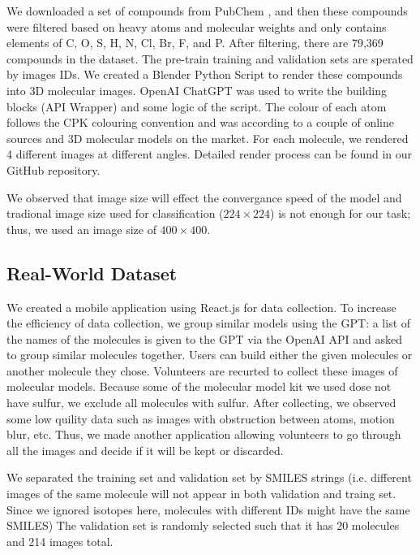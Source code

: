 \documentclass{article}
\begin{document}
We downloaded a set of compounds from PubChem \autocite{kim_pubchem_2023}, and then these compounds were filtered based on heavy atoms and molecular weights and only contains elements of C, O, S, H, N, Cl, Br, F, and P.
After filtering, there are 79,369 compounds in the dataset. The pre-train training and validation sets are sperated by images IDs. We created a Blender Python Script to render these compounds into 3D molecular images. OpenAI ChatGPT was used to write the building blocks (API Wrapper) and some logic of the script. The colour of each atom follows the CPK colouring convention and was according to a couple of online sources and 3D molecular models on the market. For each molecule, we rendered 4 different images at different angles. Detailed render process can be found in our GitHub repository. 

We observed that image size will effect the convergance speed of the model and tradional image size used for classification ($224\times224$) is not enough for our task; thus, we used an image size of $400\times400$. 
\subsection{Real-World Dataset}
We created a mobile application using React.js for data collection. To increase the efficiency of data collection, we group similar models using the GPT: a list of the names of the molecules is given to the GPT via the OpenAI API and asked to group similar molecules together. Users can build either the given molecules or another molecule they chose. Volunteers are recurted to collect these images of molecular models. Because some of the molecular model kit we used dose not have sulfur, we exclude all molecules with sulfur. After collecting, we observed some low quility data such as images with obstruction between atoms, motion blur, etc. Thus, we made another application allowing volunteers to go through all the images and decide if it will be kept or discarded.

We separated the training set and validation set by SMILES strings (i.e. different images of the same molecule will not appear in both validation and traing set. Since we ignored isotopes here, molecules with different IDs might have the same SMILES) The validation set is randomly selected such that it has 20 molecules and 214 images total. 
\end{document}
